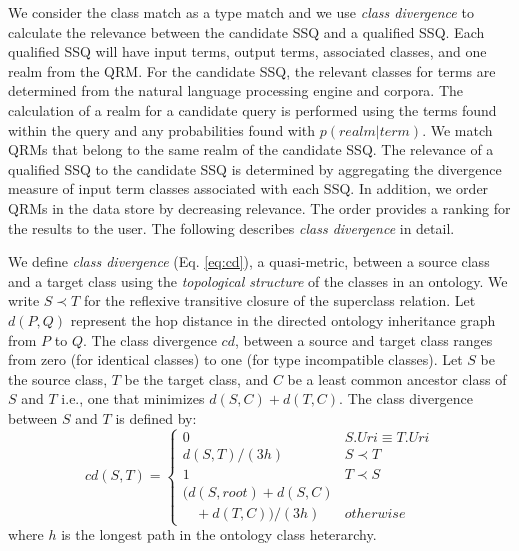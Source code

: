 We consider the class match as a type match and we use \emph{class divergence} to calculate the relevance between the candidate SSQ and a qualified SSQ. Each qualified SSQ will have input terms, output terms, associated classes, and one realm from the QRM.  For the candidate SSQ, the relevant classes for terms are determined from the natural language processing engine and corpora. The calculation of a realm for a candidate query is performed using the terms found within the query and any probabilities found with $p(realm|term)$. %
We match QRMs that belong to the same realm of the candidate SSQ. The relevance of a qualified SSQ to the candidate SSQ is determined by aggregating the divergence measure of input term classes associated with each SSQ. In addition, we order QRMs in the data store by decreasing relevance. The order provides a ranking for the results to the user. The following describes \emph{class divergence} in detail.


We define \textit{class divergence} (Eq. \ref{eq:cd}), a quasi-metric, between a source class and a target class using the \textit{topological structure} of the classes in an ontology. We write $S \prec T$ for the reflexive transitive closure of the superclass relation. Let $d(P,Q)$ represent the hop distance in the directed ontology inheritance graph from $P$ to $Q$. The class divergence $cd$, between a source and target class ranges from zero (for identical classes) to one (for type incompatible classes). Let $S$ be the source class, $T$ be the target class, and $C$ be a least common ancestor class of $S$ and $T$ i.e., one that minimizes $d(S,C) + d(T,C)$. The class divergence between $S$ and $T$ is defined by:
\begin{equation}
\label{eq:cd}
cd(S, T) = \begin{cases}
0 & S.{Uri} \equiv T.{Uri}\\
d(S, T)/(3h) & S \prec T\\
1 & T \prec S\\
(d(S,root) + d(S,C) \\ \ \ \ \ + d(T,C))/(3h) & otherwise
\end{cases}
\end{equation}
where $h$ is the longest path in the ontology class heterarchy.

